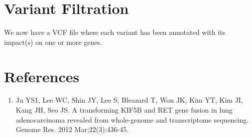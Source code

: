 
\section{Variant Filtration}

We now have a VCF file where each variant has been annotated with its impact(s) on one or more genes. 


\newpage


\section{References}

\begin{enumerate}
  \item Ju YS1, Lee WC, Shin JY, Lee S, Bleazard T, Won JK, Kim YT, Kim JI, Kang JH, Seo JS. A transforming KIF5B and RET gene fusion in lung adenocarcinoma revealed from whole-genome and transcriptome sequencing. Genome Res. 2012 Mar;22(3):436-45. 
\end{enumerate}
